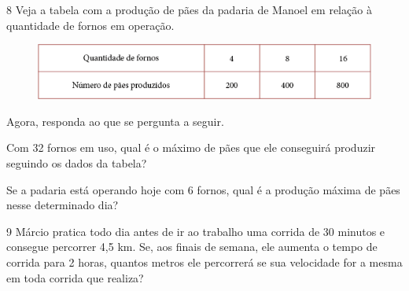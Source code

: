 \begin{mdframed}[linewidth=2pt,linecolor=salmao,roundcorner=2pt]





\vspace{2cm}
\end{mdframed}

\num{8} Veja a tabela com a produção de pães da padaria de Manoel em relação à quantidade de fornos em operação.

\begin{figure}[htpb!]
\centering
\includegraphics[width=\textwidth]{media/image71.png}
\end{figure}

\pagebreak
Agora, responda ao que se pergunta a seguir.

\begin{escolha}
\item
  Com 32 fornos em uso, qual é o máximo de pães que ele conseguirá
  produzir seguindo os dados da tabela?


\item
  Se a padaria está operando hoje com 6 fornos, qual é a produção máxima
  de pães nesse determinado dia?

\end{escolha}

\num{9} Márcio pratica todo dia antes de ir ao trabalho uma corrida de 30
minutos e consegue percorrer 4,5 km. Se, aos finais de semana, ele aumenta o
tempo de corrida para 2 horas, quantos metros ele percorrerá se sua
velocidade for a mesma em toda corrida que realiza?

